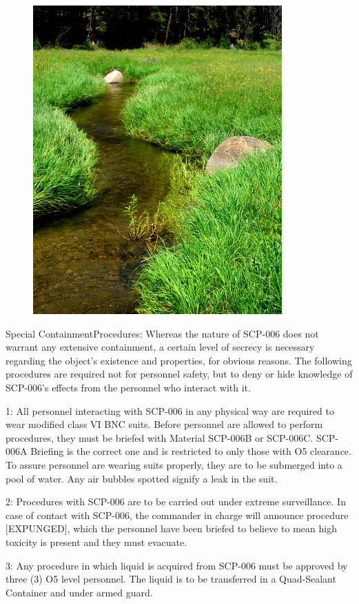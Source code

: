 \documentclass[a4paper, 11pt]{article}
\newcommand{\lb}{\ensuremath{[}}
\newcommand{\rb}{\ensuremath{]}}
\begin{document}
\begin{figure}
\includegraphics[scale=0.55]{img/scp/006.jpg}
\end{figure}

Special Containment\linebreak Procedures: Whereas the nature of SCP-006 does not warrant any extensive containment, a certain level of secrecy is necessary regarding the object's existence and properties, for obvious reasons. The following procedures are required not for personnel safety, but to deny or hide knowledge of SCP-006's effects from the personnel who interact with it.

1: All personnel interacting with SCP-006 in any physical way are required to wear modified class VI BNC suits. Before personnel are allowed to perform procedures, they must be briefed with Material SCP-006B or SCP-006C. SCP-006A Briefing is the correct one and is restricted to only those with O5 clearance. To assure personnel are wearing suits properly, they are to be submerged into a pool of water. Any air bubbles spotted signify a leak in the suit.

2: Procedures with SCP-006 are to be carried out under extreme surveillance. In case of contact with SCP-006, the commander in charge will announce procedure \lb EXPUNGED\rb, which the personnel have been briefed to believe to mean high toxicity is present and they must evacuate.

3: Any procedure in which liquid is acquired from SCP-006 must be approved by three (3) O5 level personnel. The liquid is to be transferred in a Quad-Sealant Container and under armed guard.
\end{document}
